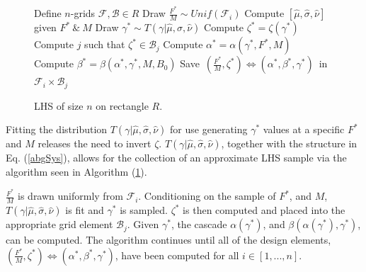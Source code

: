 \documentclass[12pt]{article}
\begin{document}

%
\clearpage
%
\begin{figure}
	\vspace{-1cm}
	\begin{minipage}{0.5\textwidth}
      		\begin{algorithm}[H]
			\caption{LHS of size $n$ on rectangle $R$.}
			\label{lhsAlg}
			\begin{algorithmic}[1]
			\State Define $n$-grids $\mathcal{F}, \mathcal{B}\in R$
			\State Draw $\frac{F^*}{M} \sim Unif(\mathcal{F}_i)$
			\State Compute $[\hat\mu, \hat\sigma, \hat\nu]$ given $F^*~\&~M$
				\State Draw $\gamma^* \sim T(\gamma|\hat\mu, \hat\sigma, \hat\nu)$
				\State Compute $\zeta^* = \zeta(\gamma^*)$
				\State Compute $j$ such that $\zeta^*\in\mathcal{B}_j$
			\EndWhile
			\State Compute $\alpha^* = \alpha(\gamma^*, F^*, M)$ 
			\State Compute $\beta^* = \beta(\alpha^*, \gamma^*, M, B_0)$	
			\State \mbox{Save $(\frac{F^*}{M}, \zeta^*)\Leftrightarrow(\alpha^*, \beta^*, \gamma^*)$ in $\mathcal{F}_i\times\mathcal{B}_j$} 
			\EndFor
			\EndProcedure
			\end{algorithmic}
		\end{algorithm}
	\end{minipage}
\end{figure}

Fitting the distribution $T(\gamma|\hat\mu, \hat\sigma, \hat\nu)$ for 
use generating $\gamma^*$ values at a specific $F^*$ and $M$ releases the 
need to invert $\zeta$. $T(\gamma|\hat\mu, \hat\sigma, \hat\nu)$, together with 
the structure in Eq. (\ref{abgSys}), allows for the collection of an approximate
LHS sample via the algorithm seen in Algorithm (\ref{lhsAlg}).%

%
$\frac{F^*}{M}$ is drawn uniformly from $\mathcal{F}_i$. Conditioning on the 
sample of $F^*$, and $M$, $T(\gamma|\hat\mu, \hat\sigma, \hat\nu)$ is fit and 
$\gamma^*$ is sampled. $\zeta^*$ is then computed and placed into the appropriate
grid element $\mathcal{B}_j$. Given $\gamma^*$, the cascade $\alpha(\gamma^*)$, 
and $\beta(\alpha(\gamma^*), \gamma^*)$, can be computed. The algorithm 
continues until all of the design elements, $(\frac{F^*}{M}, \zeta^*)\Leftrightarrow(\alpha^*, \beta^*, \gamma^*)$,
have been computed for all $i\in[1,...,n]$.
\end{document}
